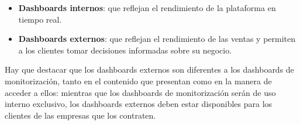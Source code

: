 \begin{itemize}
	\item \textbf{Dashboards internos}: que reflejan el rendimiento de la plataforma en tiempo real.
	\item \textbf{Dashboards externos}: que reflejan el rendimiento de las ventas y permiten a los
	      clientes tomar decisiones informadas sobre su negocio.
\end{itemize}

Hay que destacar que los dashboards externos son diferentes a los dashboards de monitorización, tanto
en el contenido que presentan como en la manera de acceder a ellos: mientras que los dashboards de
monitorización serán de uso interno exclusivo, los dashboards externos deben estar disponibles para
los clientes de las empresas que los contraten.





